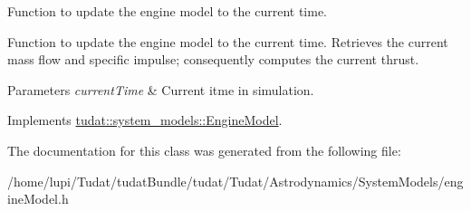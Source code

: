 Function to update the engine model to the current time. 

Function to update the engine model to the current time. Retrieves the current mass flow and specific impulse; consequently computes the current thrust. 
\begin{DoxyParams}{Parameters}
{\em current\+Time} & Current itme in simulation. \\
\hline
\end{DoxyParams}


Implements \hyperlink{classtudat_1_1system__models_1_1EngineModel_acfe8c7ecd66348ad08d094990d79118f}{tudat\+::system\+\_\+models\+::\+Engine\+Model}.



The documentation for this class was generated from the following file\+:\begin{DoxyCompactItemize}
\item 
/home/lupi/\+Tudat/tudat\+Bundle/tudat/\+Tudat/\+Astrodynamics/\+System\+Models/engine\+Model.\+h\end{DoxyCompactItemize}
